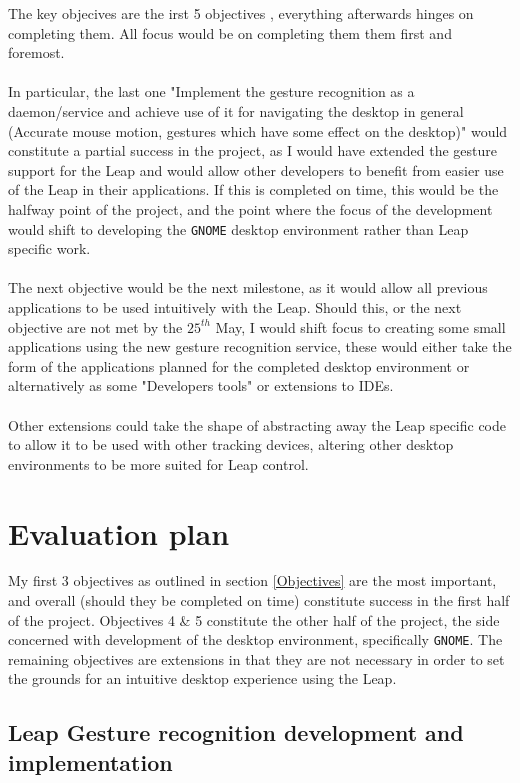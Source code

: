 \documentclass[a4paper]{article}
\begin{document}
 The key objecives are the irst 5 objectives , everything afterwards hinges on completing them. All focus would be on completing them them first and foremost. \\ \\ In particular, the last one "Implement the gesture recognition as a daemon/service and achieve use of it for navigating the desktop in general (Accurate mouse motion, gestures which have some effect on the desktop)" would constitute a partial success in the project, as I would have extended the gesture support for the Leap and would allow other developers to benefit from easier use of the Leap in their applications. If this is completed on time, this would be the halfway point of the project, and the point where the focus of the development would shift to developing the \texttt{GNOME} desktop environment rather than Leap specific work. \\ \\ The next objective would be the next milestone, as it would allow all previous applications to be used intuitively with the Leap. Should this, or the next objective are not met by the $25^{th}$ May, I would shift focus to creating some small applications using the new gesture recognition service, these would either take the form of the applications planned for the completed desktop environment or alternatively as some "Developers tools" or extensions to IDEs. 
 \\ \\ Other extensions could take the shape of abstracting away the Leap specific code to allow it to be used with other tracking devices, altering other desktop environments to be more suited for Leap control.
 \newpage
\section{Evaluation plan}
My first 3 objectives as outlined in section \ref{Objectives} are the most important, and overall (should they be completed on time) constitute  success in the first half of the project. Objectives 4 \& 5 constitute the other half of the project, the side concerned with development of the desktop environment, specifically \texttt{GNOME}. The remaining objectives are extensions in that they are not necessary in order to set the grounds for an intuitive desktop experience using the Leap. 
\subsection{Leap Gesture recognition development and implementation} 
\end{document}
